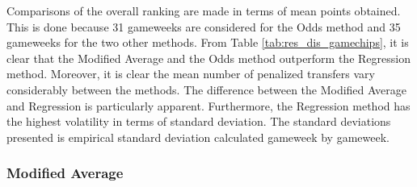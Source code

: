 Comparisons of the overall ranking are made in terms of mean points obtained. This is done because 31 gameweeks are considered for the Odds method and 35 gameweeks for the two other methods. From Table \ref{tab:res_dis_gamechips}, it is clear that the Modified Average and the Odds method outperform the Regression method. Moreover, it is clear the mean number of penalized transfers vary considerably between the methods. The difference between the Modified Average and Regression is particularly apparent. Furthermore, the Regression method has the highest volatility in terms of standard deviation. The standard deviations presented is empirical standard deviation calculated gameweek by gameweek.

\begin{table}[H]
\centering
{}
\caption{Results disregarding gamechips.}
\label{tab:res_dis_gamechips}
\end{table}

 

\subsubsection{Modified Average}

